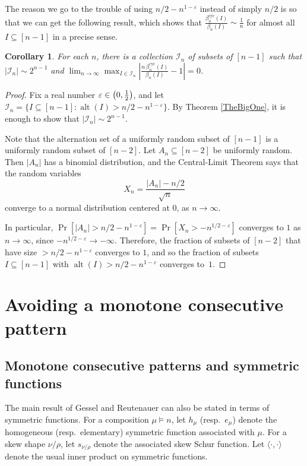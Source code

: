 \documentclass[12pt]{article}
\newcommand{\smallfrac}[2]{\textstyle\frac{#1}{#2}\displaystyle}
\newcommand{\betacyc}{\beta^{\text{cyc}}}
\DeclareMathOperator{\alt}{alt}
\newtheorem{cor}[thm]{Corollary}
\theoremstyle{definition}
\begin{document}
The reason we go to the trouble of using $n/2 - n^{1-\varepsilon}$ instead of simply $n/2$ is so that we can get the following result, which shows that $\frac{\betacyc_n(I)}{\beta_n(I)} \sim \frac{1}{n}$ for almost all $I \subseteq [n-1]$ in a precise sense.

\begin{cor} \label{AlmostAll} For each $n$, there is a collection $\mathcal{I}_n$ of subsets of $[n-1]$ such that $\left|\mathcal{I}_n\right|\sim 2^{n-1}$ and $\lim_{n\to\infty} \max_{I \in \mathcal{I}_n} \left|\frac{n\,\betacyc_n(I)}{\beta_n(I)} - 1\right| = 0$.
\end{cor}

\begin{proof}
Fix a real number $\varepsilon \in \left(0, \smallfrac12\right)$, and let $\mathcal{I}_n = \{I \subseteq [n-1] \colon \alt(I) > n/2 - n^{1-\varepsilon}\}$. 
By Theorem \ref{TheBigOne}, it is enough to show that $\left|\mathcal{I}_n\right|\sim 2^{n-1}$.

Note that the alternation set of a uniformly random subset of $[n-1]$ is a uniformly random subset of $[n-2]$.
Let $A_n\subseteq [n-2]$ be uniformly random. Then $|A_n|$ has a binomial distribution, and the Central-Limit Theorem says that the random variables
\[ X_n = \frac{|A_n| - n/2}{\sqrt{n}} \]
converge to a normal distribution centered at $0$, as $n \to \infty$.

In particular, $\Pr[|A_n| > n/2 - n^{1-\varepsilon}]=\Pr[X_n > -n^{1/2-\varepsilon}]$ converges to $1$ as $n \to \infty$, since $-n^{1/2-\varepsilon} \to -\infty$.
Therefore, the fraction of subsets of $[n-2]$ that have size $> n/2 - n^{1-\varepsilon}$ converges to $1$, and so the fraction of subsets $I \subseteq [n-1]$ with $\alt(I) > n/2 - n^{1-\varepsilon}$ converges to~$1$.
\end{proof}

\section{Avoiding a monotone consecutive pattern} \label{sec:monotone}

\subsection{Monotone consecutive patterns and symmetric functions}
\label{MonotoneSubsection1}

The main result of Gessel and Reutenauer \cite{GR} can also be stated in terms of symmetric functions. For a composition $\mu \vDash n$, let $h_\mu$ (resp.\ $e_\mu$) denote the homogeneous (resp.\ elementary) symmetric function associated with $\mu$. For a skew shape $\nu/\rho$, let $s_{\nu/\rho}$ denote the associated skew Schur function. Let $\langle \cdot, \cdot \rangle$ denote the usual inner product on symmetric functions.
\end{document}
